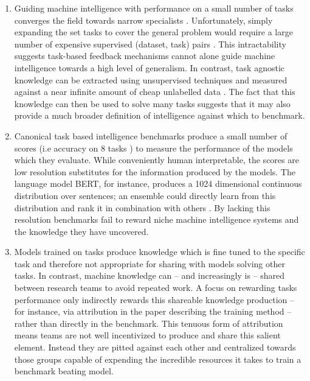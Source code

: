 \documentclass{article}
\begin{document}
\begin{enumerate}
	\item Guiding machine intelligence with performance on a  small number of tasks converges the field towards narrow specialists \cite{chollet2019measure}. Unfortunately, simply expanding the set tasks to cover the general problem would require a large number of expensive supervised (dataset, task) pairs \cite{radford2019language}. This intractability suggests task-based feedback mechanisms cannot alone guide machine intelligence towards a high level of generalism. In contrast, task agnostic knowledge can be extracted using unsupervised techniques and measured against a near infinite amount of cheap unlabelled data \cite{devlin2018bert}. The fact that this knowledge can then be used to solve many tasks \cite{radford2019language} suggests that it may also provide a much broader definition of intelligence against which to benchmark. 
	
	\item Canonical task based intelligence benchmarks produce a small number of scores (i.e accuracy on 8 tasks \cite{wang2019superglue}) to measure the performance of the models which they evaluate. While conveniently human interpretable, the scores are low resolution substitutes for the information produced by the models. The language model BERT, for instance, produces a 1024 dimensional continuous distribution over sentences; an ensemble could directly learn from this distribution and rank it in combination with others \cite{shazeer2017outrageously}. By lacking this resolution benchmarks fail to reward niche machine intelligence systems and the knowledge they have uncovered.
	
	\item Models trained on tasks produce knowledge which is fine tuned to the  specific task and therefore not appropriate for sharing with models solving other tasks. In contrast, machine knowledge can -- and increasingly is \cite{Sanh2019DistilBERT} -- shared between research teams to avoid repeated work. A focus on rewarding tasks performance only indirectly rewards this shareable knowledge production -- for instance, via attribution in the paper describing the training method -- rather than directly in the benchmark. This tenuous form of attribution means teams are not well incentivized to produce and share this salient element. Instead they are pitted against each other and centralized towards those groups capable of expending the incredible resources it takes to train a benchmark beating model.
\end{enumerate}
\end{document}
